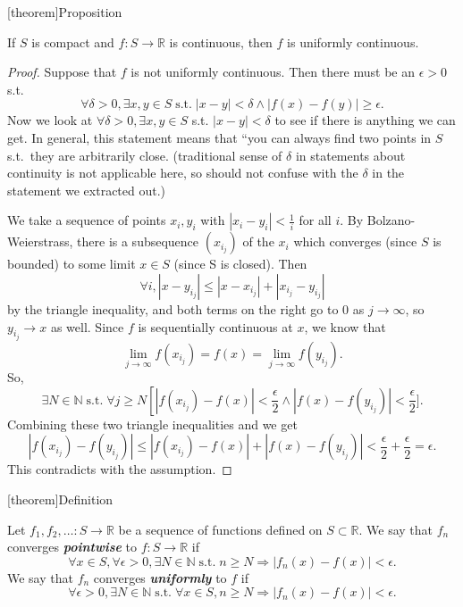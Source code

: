 \documentclass[12pt]{report}
\theoremstyle{definition}
\begin{document}
[theorem]{Proposition}
\begin{compact and continuous is uniformly continuous}
    If $S$ is compact and $f:S\rightarrow\mathbb{R}$ is continuous, then $f$ is 
    uniformly continuous.
\end{compact and continuous is uniformly continuous}

\begin{proof}
    Suppose that $f$ is not uniformly continuous.
    Then there must be an $\epsilon > 0$ s.t. \[
        \forall \delta > 0, \exists x,y\in S \;\text{s.t.}\;
        |x-y|<\delta \wedge |f(x)-f(y)|\ge{}\epsilon.
    \]
    Now we look at $\forall \delta > 0, \exists x,y\in S$ s.t. $|x-y|<\delta$ 
    to see if there is anything we can get.
    In general, this statement means that ``you can always
    find two points in $S$ s.t.\ they are arbitrarily close.
    (traditional sense of $\delta$ in statements about continuity
    is not applicable here, so should not confuse with the $\delta$
    in the statement we extracted out.)

    \medskip\noindent
    We take a sequence of points $x_i, y_i$ with $|x_i-y_i|<\frac{1}{i}$
    for all $i$. By Bolzano-Weierstrass, there is a subsequence
    $(x_{i_j})$ of the $x_i$ which converges (since $S$ is bounded)
    to some limit $x\in S$ (since S is closed). Then \[
        \forall i, |x-y_{i_j}|\le|x-x_{i_j}|+|x_{i_j}-y_{i_j}|
    \]by the triangle inequality, and both terms on the right
    go to 0 as $j\rightarrow\infty$, so $y_{i_j}\rightarrow x$ as well.  
    Since $f$ is sequentially continuous at $x$, we know that \[
        \lim_{j\rightarrow\infty}f(x_{i_j}) = f(x) =
        \lim_{j\rightarrow\infty}f(y_{i_j}).
    \]
    So,\[
        \exists N\in\mathbb{N} \;\text{s.t.}\; \forall j \ge N
        \left[|f(x_{i_j})-f(x)|<\frac{\epsilon}{2} \wedge
        |f(x)-f(y_{i_j})|<\frac{\epsilon}{2}].
    \]
    Combining these two triangle inequalities and we get\[
        |f(x_{i_j})-f(y_{i_j})|
        \le|f(x_{i_j})-f(x)| + |f(x)-f(y_{i_j})|
        < \frac{\epsilon}{2}+\frac{\epsilon}{2} = \epsilon.
    \]
    This contradicts with the assumption.
\end{proof} 

[theorem]{Definition}
\begin{function convergence}
    Let $f_1, f_2,\ldots:S\rightarrow\mathbb{R}$ be a sequence of functions
    defined on $S\subset\mathbb{R}$.
    We say that $f_n$ converges \textbf{\emph{pointwise}} to $f:S\rightarrow\mathbb{R}$
    if \[
        \forall x\in S, \forall \epsilon>0, \exists N\in\mathbb{N}
        \;\text{s.t.}\; n\ge N \Longrightarrow
        |f_n(x)-f(x)|<\epsilon.
    \] We say that $f_n$ converges \textbf{\emph{uniformly}} to $f$ if\[
        \forall \epsilon>0, \exists N\in\mathbb{N} \;\text{s.t.}\;
        \forall x\in S, n\ge N \Longrightarrow |f_n(x)-f(x)|<\epsilon.
    \]
\end{function convergence}
\end{document}
